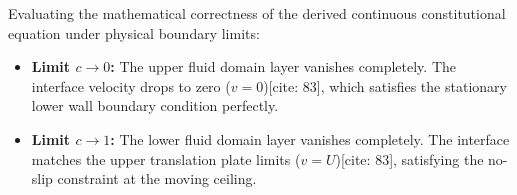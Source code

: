 Evaluating the mathematical correctness of the derived continuous constitutional equation under physical boundary limits:
\begin{itemize}
    \item \textbf{Limit $c \to 0$:} The upper fluid domain layer vanishes completely. The interface velocity drops to zero ($v = 0$)[cite: 83], which satisfies the stationary lower wall boundary condition perfectly.
    \item \textbf{Limit $c \to 1$:} The lower fluid domain layer vanishes completely. The interface matches the upper translation plate limits ($v = U$)[cite: 83], satisfying the no-slip constraint at the moving ceiling.
\end{itemize}